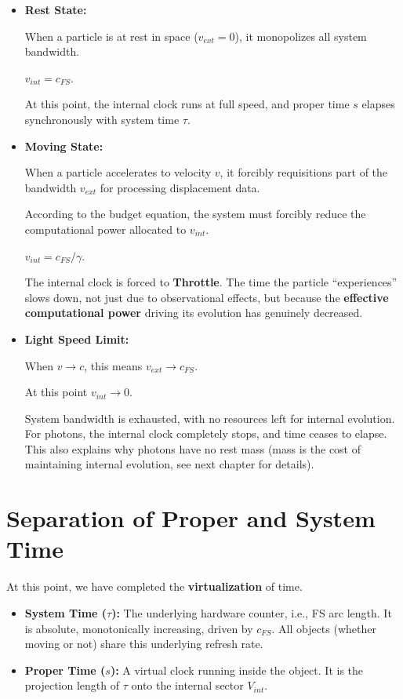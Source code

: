 \begin{itemize}
\item \textbf{Rest State:}

    When a particle is at rest in space (\textbf{$v_{ext} = 0$}), it monopolizes all system bandwidth.

    \textbf{$v_{int} = c_{FS}$}.

    At this point, the internal clock runs at full speed, and proper time \textbf{$s$} elapses synchronously with system time \textbf{$\tau$}.

\item \textbf{Moving State:}

    When a particle accelerates to velocity \textbf{$v$}, it forcibly requisitions part of the bandwidth \textbf{$v_{ext}$} for processing displacement data.

    According to the budget equation, the system must forcibly reduce the computational power allocated to \textbf{$v_{int}$}.

    \textbf{$v_{int} = c_{FS} / \gamma$}.

    The internal clock is forced to \textbf{Throttle}. The time the particle ``experiences'' slows down, not just due to observational effects, but because the \textbf{effective computational power} driving its evolution has genuinely decreased.

\item \textbf{Light Speed Limit:}

    When \textbf{$v \to c$}, this means \textbf{$v_{ext} \to c_{FS}$}.

    At this point \textbf{$v_{int} \to 0$}.

    System bandwidth is exhausted, with no resources left for internal evolution. For photons, the internal clock completely stops, and time ceases to elapse. This also explains why photons have no rest mass (mass is the cost of maintaining internal evolution, see next chapter for details).
\end{itemize}

\section{Separation of Proper and System Time}

At this point, we have completed the \textbf{virtualization} of time.

\begin{itemize}
\item \textbf{System Time ($\tau$):} The underlying hardware counter, i.e., FS arc length. It is absolute, monotonically increasing, driven by \textbf{$c_{FS}$}. All objects (whether moving or not) share this underlying refresh rate.

\item \textbf{Proper Time ($s$):} A virtual clock running inside the object. It is the projection length of \textbf{$\tau$} onto the internal sector \textbf{$V_{int}$}.
\end{itemize}

